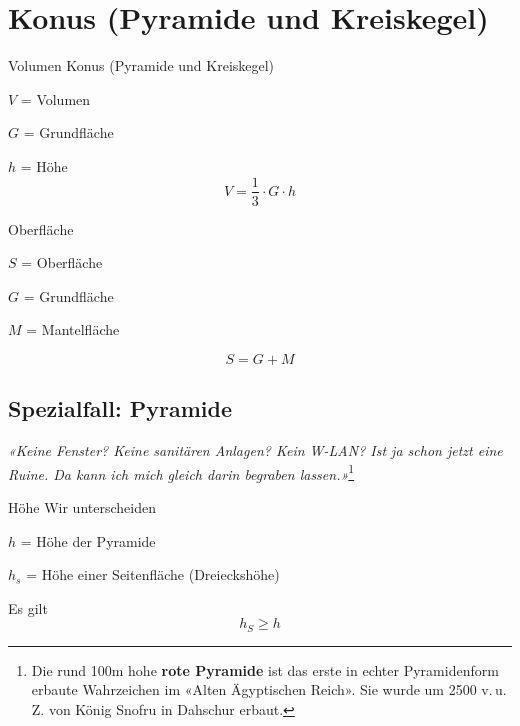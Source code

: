 \section{Konus (Pyramide und Kreiskegel)}



\begin{gesetz}{Volumen Konus (Pyramide und Kreiskegel)}{}
  
  $V$ = Volumen
  
  $G$ = Grundfläche

  $h$ = Höhe
  $$V = \frac13\cdot{}G\cdot{}h$$
\end{gesetz}

\begin{gesetz}{Oberfläche}{}

  $S$ = Oberfläche

  $G$ = Grundfläche

  $M$ = Mantelfläche

  $$S = G + M$$
  \end{gesetz}
\newpage

\subsection{Spezialfall: Pyramide}


\begin{center}
{\textit{«Keine Fenster? Keine sanitären Anlagen? Kein W-LAN? Ist ja schon
jetzt eine Ruine. Da kann ich mich gleich darin begraben
lassen.»}}\footnote{Die rund 100m hohe \textbf{rote Pyramide} ist das
  erste in echter Pyramidenform erbaute Wahrzeichen im «Alten
  Ägyptischen Reich». Sie wurde um 2500 v.\,u.\,Z. von König Snofru in
Dahschur erbaut.}
\end{center}


\begin{bemerkung}{Höhe}{}
  Wir unterscheiden

  $h$ = Höhe der Pyramide

  $h_s$ = Höhe einer Seitenfläche (Dreieckshöhe)
\end{bemerkung}
\begin{gesetz}{}{}
  Es gilt
  $$h_S \ge h$$
  \end{gesetz}
\newpage

